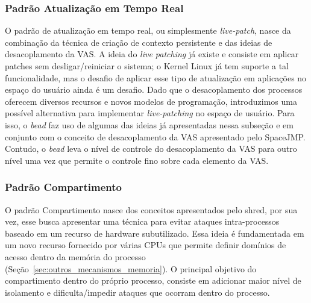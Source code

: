 \subsubsection{Padrão Atualização em Tempo Real}
O padrão de atualização em tempo real, ou simplesmente \emph{live-patch}, nasce
da combinação da técnica de criação de contexto persistente e das ideias de
desacoplamento da VAS. A ideia do \emph{live patching} já existe e consiste em
aplicar patches sem desligar/reiniciar o sistema; o Kernel Linux já tem suporte
a tal funcionalidade, mas o desafio de aplicar esse tipo de atualização em
aplicações no espaço do usuário ainda é um desafio. Dado que o desacoplamento
dos processos oferecem diversos recursos e novos modelos de programação,
introduzimos uma possível alternativa para implementar \emph{live-patching} no
espaço de usuário. Para isso, o \emph{bead} faz uso de algumas das ideias já
apresentadas nessa subseção e em conjunto com o conceito de desacoplamento da
VAS apresentado pelo SpaceJMP. Contudo, o \emph{bead} leva o nível de controle
do desacoplamento da VAS para outro nível uma vez que permite o controle fino
sobre cada elemento da VAS.



\subsubsection{Padrão Compartimento}

O padrão Compartimento nasce dos conceitos apresentados pelo shred, por sua
vez, esse busca apresentar uma técnica para evitar ataques intra-processos
baseado em um recurso de hardware subutilizado. Essa ideia é fundamentada em um
novo recurso fornecido por várias CPUs que permite definir domínios de acesso
dentro da memória do processo (Seção~\ref{sec:outros_mecanismos_memoria}). O
principal objetivo do compartimento dentro do próprio processo, consiste em
adicionar maior nível de isolamento e dificulta/impedir ataques que ocorram
dentro do processo.



